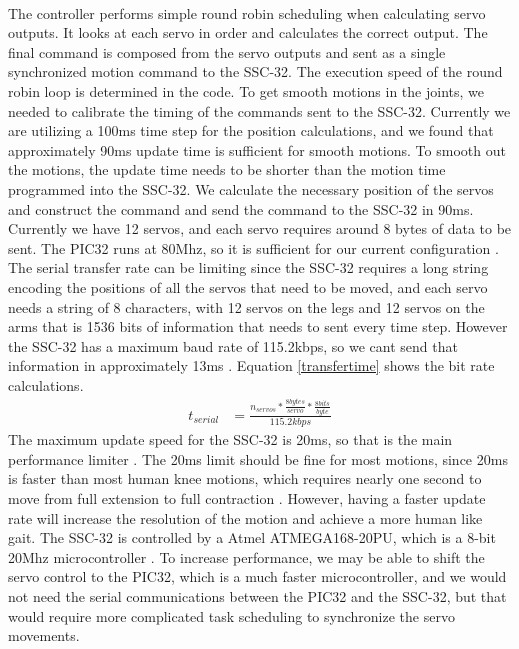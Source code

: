 \documentclass[titlepage,letterpaper,12pt]{article}
\begin{document}
\paragraph{}The controller performs simple round robin scheduling when
calculating servo outputs. It looks at each servo in order and calculates the
correct output. The final command is composed from the servo outputs and sent as
a single synchronized motion command to the SSC-32. The execution speed of the
round robin loop is determined in the code. To get smooth motions in the joints,
we needed to calibrate the timing of the commands sent to the SSC-32. Currently
we are utilizing a 100ms time step for the position calculations, and we found
that approximately 90ms update time is sufficient for smooth motions. To smooth
out the motions, the update time needs to be shorter than the motion time
programmed into the SSC-32.  We calculate the necessary position of the servos
and construct the command and send the command to the SSC-32 in 90ms. Currently
we have 12 servos, and each servo requires around 8 bytes of data to be sent.
The PIC32 runs at 80Mhz, so it is sufficient for our current configuration
\cite{pic32data}. The serial transfer rate can be limiting since the SSC-32
requires a long string encoding the positions of all the servos that need to be
moved, and each servo needs a string of 8 characters, with 12 servos on the legs
and 12 servos on the arms that is 1536 bits of information that needs to sent
every time step. However the SSC-32 has a maximum baud rate of 115.2kbps, so we
cant send that information in approximately 13ms \cite{sscdata}. Equation
\ref{transfertime} shows the bit rate calculations.
\begin{align}
    t_{serial} &= \frac{n_{servos} * \frac{8 bytes}{servo} * \frac{8 bits}{byte}}
        {115.2 kbps} \label{transfertime}
\end{align}
The maximum update speed for the SSC-32 is 20ms, so that is the main performance
limiter \cite{lynxmaxspeed}.  The 20ms limit should be fine for most motions,
since 20ms is faster than most human knee motions, which requires nearly one
second to move from full extension to full contraction
\cite{williamson2001detecting}. However, having a faster update rate will
increase the resolution of the motion and achieve a more human like gait. The
SSC-32 is controlled by a Atmel ATMEGA168-20PU, which is a 8-bit 20Mhz
microcontroller \cite{Atmega168data}. To increase performance, we may be able to
shift the servo control to the PIC32, which is a much faster microcontroller,
and we would not need the serial communications between the PIC32 and the
SSC-32, but that would require more complicated task scheduling to synchronize
the servo movements.
\end{document}

